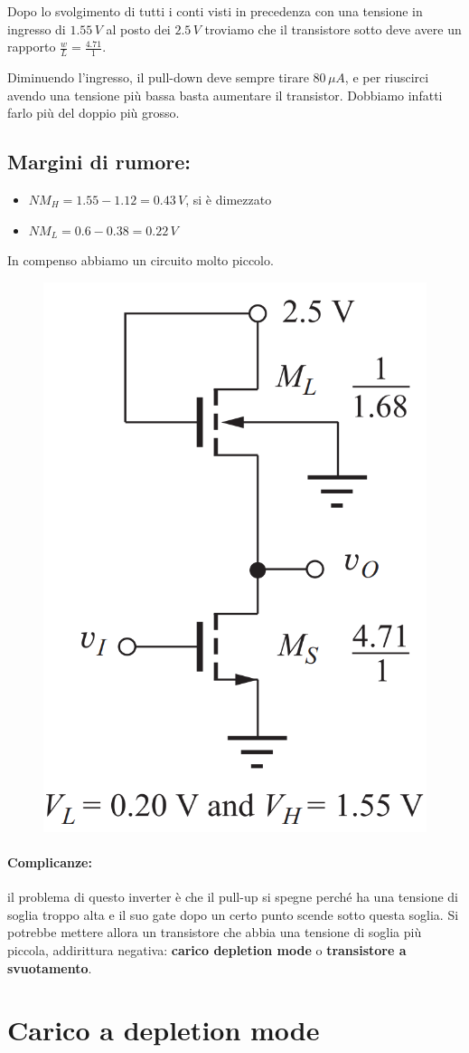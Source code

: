 Dopo lo svolgimento di tutti i conti visti in precedenza con una tensione in ingresso di $1.55\,V$ al posto dei $ 2.5\,V$ troviamo che il transistore sotto deve avere un rapporto $\frac{w}{L} = \frac{4.71}{1}$.

Diminuendo l'ingresso, il pull-down deve sempre tirare $80 \,\mu A$, e per riuscirci avendo una tensione più bassa basta aumentare il transistor. Dobbiamo infatti farlo più del doppio più grosso.

\subsection{Margini di rumore: }

\begin{itemize}
    \item[] $NM_H = 1.55 - 1.12 = 0.43 \,V$, si è dimezzato
    \item[] $NM_L = 0.6 - 0.38 = 0.22 \,V$
\end{itemize}

In compenso abbiamo un circuito molto piccolo.

\begin{figure}[htbp]
    \centering
    \includegraphics[width=0.25\linewidth]{img/dim_M_s.png}  
    
\end{figure}


\newpage
\paragraph{Complicanze:} il problema di questo inverter è che il pull-up si spegne perché ha una tensione di soglia troppo alta e il suo gate dopo un certo punto scende sotto questa soglia. Si potrebbe mettere allora un transistore che abbia una tensione di soglia più piccola, addirittura negativa: \textbf{carico depletion mode} o \textbf{transistore a svuotamento}.

\newpage
\section{Carico a depletion mode}

